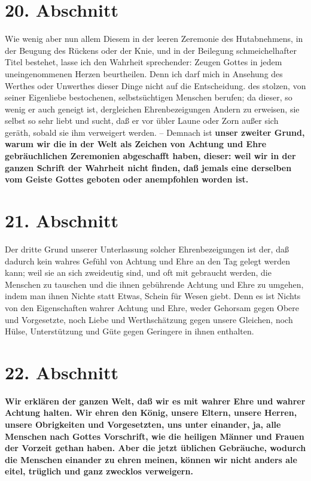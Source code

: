 \section{20. Abschnitt} \label{kap9_ab20}

Wie wenig aber nun allem Diesem in der leeren Zeremonie des Hutabnehmens, in
der Beugung des Rückens oder der Knie, und in der Beilegung schmeichelhafter
Titel bestehet, lasse ich den Wahrheit sprechender: Zeugen Gottes in jedem
uneingenommenen Herzen beurtheilen. Denn ich darf mich in Ansehung des Werthes
oder Unwerthes dieser Dinge nicht auf die Entscheidung. des stolzen, von seiner
Eigenliebe bestochenen, selbstsüchtigen Menschen berufen; da dieser, so wenig er
auch geneigt ist, dergleichen Ehrenbezeigungen Andern zu erweisen, sie selbst so
sehr liebt und sucht, daß er vor übler Laune oder Zorn außer sich geräth, sobald
sie ihm verweigert werden. -- Demnach ist \label{ref:09_20_zeiter_grund}
\textbf{unser zweiter Grund, warum wir die in
der Welt als Zeichen von Achtung und Ehre gebräuchlichen Zeremonien abgeschafft
haben, dieser: weil wir in der ganzen Schrift der Wahrheit nicht finden, daß
jemals eine derselben vom Geiste Gottes geboten oder anempfohlen worden ist.}

\section{21. Abschnitt} \label{kap9_ab21}

Der dritte Grund unserer Unterlassung solcher Ehrenbezeigungen ist der, daß
dadurch kein wahres Gefühl von Achtung und Ehre an den Tag gelegt werden kann;
weil sie an sich zweideutig sind, und oft mit gebraucht werden, die Menschen zu
tauschen und die ihnen gebührende Achtung und Ehre zu umgehen, indem man ihnen
Nichte statt Etwas, Schein für Wesen giebt. Denn es ist Nichts von den
Eigenschaften wahrer Achtung und Ehre, weder Gehorsam gegen Obere und
Vorgesetzte, noch Liebe und Werthschätzung gegen unsere Gleichen, noch Hülse,
Unterstützung und Güte gegen Geringere in ihnen enthalten.

\section{22. Abschnitt} \label{kap9_ab22}

\label{ref:09_20_koenig} \textbf{Wir erklären der ganzen Welt, daß wir
es mit wahrer Ehre und wahrer Achtung
halten. Wir ehren den König, unsere Eltern,
unsere Herren, unsere Obrigkeiten
und Vorgesetzten, uns unter einander, ja, alle
Menschen nach Gottes Vorschrift,
wie die heiligen Männer und Frauen der Vorzeit gethan haben. Aber die jetzt
üblichen Gebräuche, wodurch die Menschen einander zu ehren meinen, können wir
nicht anders ale eitel, trüglich und ganz zwecklos verweigern.}

